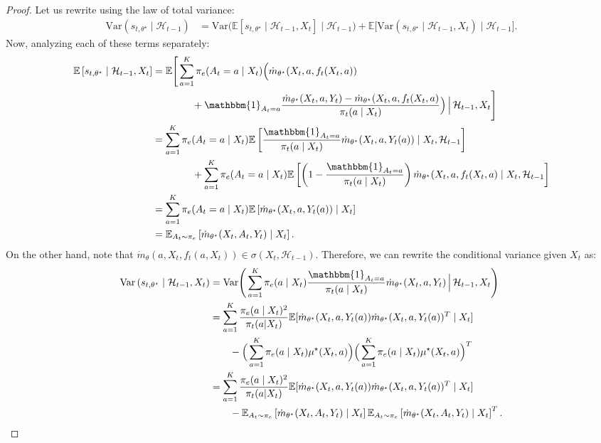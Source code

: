 \documentclass[11pt]{article}
\newcommand{\E}{\mathbb{E}}
\newcommand{\Var}{\mathrm{Var}}
\begin{document}
\begin{appendix}
\begin{proof}
Let us rewrite using the law of total variance:
\begin{align*}
\Var \left(s_{t,\theta^{\star}} \mid \mathcal{H}_{t-1} \right) 
&= \Var\Big(\E \left[ s_{t,\theta^{\star}} \mid \mathcal{H}_{t-1}, X_{t}\right] \mid \mathcal{H}_{t-1}\Big) 
+ \E\Big[\Var \left( s_{t,\theta^{\star}} \mid \mathcal{H}_{t-1}, X_{t} \right) \mid \mathcal{H}_{t-1}\Big].
\end{align*}
Now, analyzing each of these terms separately: 
\begin{align*}
\E \left[s_{t,\theta^{\star}} \mid \mathcal{H}_{t-1}, X_{t} \right] 
&= \E\Bigg[
    \sum_{a=1}^{K} \pi_{e}(A_{t} =a \mid X_{t})
    \Big(
        \dot{m}_{\theta^{\star}}(X_{t},a,f_{t}(X_{t},a)) 
        \\
&\qquad\qquad
        + \mathbbm{1}_{A_{t}=a}
        \frac{
            \dot{m}_{\theta^{\star}}(X_{t},a,Y_{t})  
            - \dot{m}_{\theta^{\star}}(X_{t},a,f_{t}(X_{t},a)
        }{
            \pi_t(a \mid X_t) 
        }
    \Big)
    \,\Big|\, \mathcal{H}_{t-1}, X_{t}
\Bigg] \\
&=  \sum_{a=1}^{K} \pi_{e}(A_{t} = a \mid X_{t} ) 
   \E \left[\frac{\mathbbm{1}_{A_{t}=a}}{ \pi_t(a \mid X_t)  }\dot{m}_{\theta^{\star}}(X_t,a,Y_{t}(a)) \mid X_{t}, \mathcal{H}_{t-1} \right]  \\
&\qquad\qquad + \sum_{a=1}^{K}\pi_{e}(A_{t} = a \mid X_{t} ) \E\left[\left(1 - \frac{\mathbbm{1}_{A_{t}=a}}{ \pi_t(a \mid X_t)  }\right)\dot{m}_{\theta^{\star}}(X_{t},a,f_{t}(X_{t},a)  \mid X_{t}, \mathcal{H}_{t-1}\right] \\
&=\sum_{a=1}^{K} \pi_{e}(A_{t} = a \mid X_{t} ) 
   \E \left[\dot{m}_{\theta^{\star}}(X_t,a,Y_{t}(a)) \mid X_{t} \right] \\
&= \E_{A_{t} \sim \pi_{e}}  
   \left[\dot{m}_{\theta^{\star}}(X_t,A_{t},Y_{t}) \mid X_{t}\right].
\end{align*}
On the other hand, note that $\dot{m}_{\theta}(a,X_{t},f_{t}(a,X_{t})) \in \sigma(X_{t}, \mathcal{H}_{t-1})$. Therefore, we can rewrite the conditional variance given \(X_t\) as:
\begin{align*}
\Var \left( s_{t,\theta^{\star}} \mid \mathcal{H}_{t-1}, X_{t} \right) 
&= \Var \Bigg( \sum_{a=1}^{K} \pi_e(a \mid X_t) \frac{\mathbbm{1}_{A_t = a}}{\pi_t(a \mid X_t)} 
\dot{m}_{\theta^{\star}}(X_t,a,Y_t) \,\Big|\, \mathcal{H}_{t-1}, X_{t} \Bigg) \\
&= \sum_{a=1}^{K} \frac{\pi_e(a \mid X_t)^2}{\pi_t(a|X_t)} 
\E[\dot{m}_{\theta^{\star}}(X_t,a,Y_t(a))\dot{m}_{\theta^{\star}}(X_t,a,Y_t(a))^{T} \mid X_t]\\
&\qquad -\Big(\sum_{a=1}^{K} \pi_e(a \mid X_t) \mu^\star(X_t,a)\Big)\Big(\sum_{a=1}^{K} \pi_e(a \mid X_t) \mu^\star(X_t,a)\Big)^{T} \\
&= \sum_{a=1}^{K} \frac{\pi_e(a \mid X_t)^2}{\pi_t(a|X_t)} 
\E[\dot{m}_{\theta^{\star}}(X_t,a,Y_t(a))\dot{m}_{\theta^{\star}}(X_t,a,Y_t(a))^{T} \mid X_t]\\
&\qquad -\E_{A_{t} \sim \pi_{e}}  \left[\dot{m}_{\theta^{\star}}(X_t,A_{t},Y_t) \mid X_t\right]\E_{A_{t} \sim \pi_{e}}  \left[\dot{m}_{\theta^{\star}}(X_t,A_{t},Y_t) \mid X_t\right]^{T}.
\end{align*} 


\end{proof}
\end{appendix}
\end{document}
